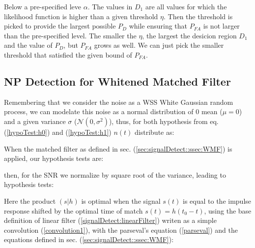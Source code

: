 \newp Below a pre-specified leve $\alpha$. The values in $D_1$ are all values for which the likelihood function is higher than a given threshold $\eta$. Then the threshold is picked to provide the largest possible $P_D$ while ensuring that $P_{FA}$ is not larger than the pre-specified level. The smaller the $\eta$, the largest the desicion region $D_1$ and the value of $P_D$, but $P_{FA}$ grows as well. We can just pick the smaller threshold that satisfied the given bound of $P_{FA}$.

\subsection{NP Detection for Whitened Matched Filter}

\newp Remembering that we consider the noise as a WSS White Gaussian random process, we can modelate this noise as a normal distribution of 0 mean ($\mu = 0$) and a given variance $\sigma$ ($\mathcal{N}(0, \sigma^{2})$), thus,  for both hypothesis from eq. (\ref{hypoTest:h0}) and (\ref{hypoTest:h1}) $n(t)$ distribute as:


\newp When the matched filter as defined in sec. (\ref{sec:signalDetect::ssec:WMF}) is applied, our hypothesis tests are:


\newp then, for the SNR we normalize by square root of the variance, leading to hypothesis tests:


\newp Here the product $(s|h)$ is optimal when the signal $s(t)$ is equal to the impulse response shifted by the optimal time of match $s(t) = h(t_0 - t)$, using the base definition of linear filter (\ref{signalDetect:linearFilter}) writen as a simple convolution (\ref{convolution1}), with the parseval's equation (\ref{parseval}) and the equations defined in sec. (\ref{sec:signalDetect::ssec:WMF}):


